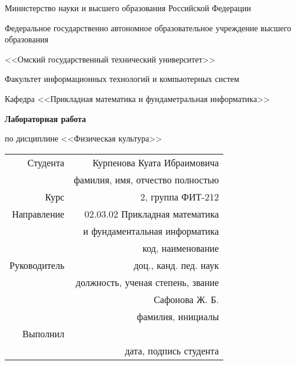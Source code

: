 \documentclass[a4paper]{article}
\begin{document}
    \thispagestyle{empty}

    \begin{center}
        Министерство науки и высшего образования Российской Федерации

        Федеральное государственно автономное образовательное учреждение высшего образования

        <<Омский государственный технический университет>>

        \vspace{1cm}
        Факультет информационных технологий и компьютерных систем

        Кафедра <<Прикладная математика и фундаметральная информатика>>

        \vspace{3cm}
        \textbf{Лабораторная работа}

        по дисциплине <<Физическая культура>>
    \end{center}
    
    \vspace{3cm}
    \begin{flushright}    
        \begin{tabular}{ r r }
            Студента & Курпенова Куата Ибраимовича \\
            \cline{2-2}
            & \tiny{фамилия, имя, отчество полностью} \\

            Курс & 2, группа ФИТ-212 \\
            \cline{2-2}
            Направление & 02.03.02 Прикладная математика \\
            \cline{2-2}
            & и фундаментальная информатика \\
            \cline{2-2}
            & \tiny{код, наименование} \\
            
            Руководитель & доц., канд. пед. наук \\
            \cline{2-2}
            & \tiny{должность, ученая степень, звание} \\
            & Сафонова Ж. Б. \\
            \cline{2-2}
            & \tiny{фамилия, инициалы} \\
            
            Выполнил & \\
            \cline{2-2}
            & \tiny{дата, подпись студента} \\
            
        \end{tabular}
    \end{flushright}
    
\end{document}

